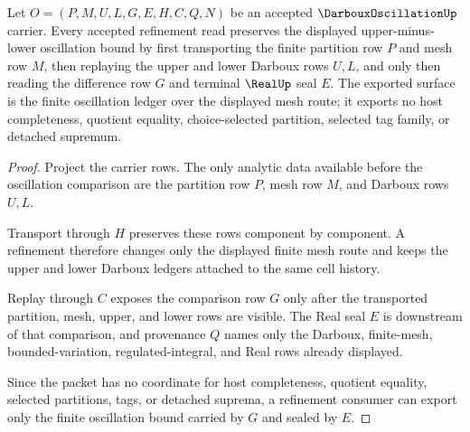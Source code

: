 \begin{theorem}\label{thm:darboux-oscillation-refinement-bound}
Let $O=(P,M,U,L,G,E,H,C,Q,N)$ be an accepted $\DarbouxOscillationUp$ carrier. Every accepted refinement read preserves the displayed upper-minus-lower oscillation bound by first transporting the finite partition row $P$ and mesh row $M$, then replaying the upper and lower Darboux rows $U,L$, and only then reading the difference row $G$ and terminal $\RealUp$ seal $E$. The exported surface is the finite oscillation ledger over the displayed mesh route; it exports no host completeness, quotient equality, choice-selected partition, selected tag family, or detached supremum.
\end{theorem}
\begin{proof}
Project the carrier rows. The only analytic data available before the oscillation comparison are the partition row $P$, mesh row $M$, and Darboux rows $U,L$.

Transport through $H$ preserves these rows component by component. A refinement therefore changes only the displayed finite mesh route and keeps the upper and lower Darboux ledgers attached to the same cell history.

Replay through $C$ exposes the comparison row $G$ only after the transported partition, mesh, upper, and lower rows are visible. The Real seal $E$ is downstream of that comparison, and provenance $Q$ names only the Darboux, finite-mesh, bounded-variation, regulated-integral, and Real rows already displayed.

Since the packet has no coordinate for host completeness, quotient equality, selected partitions, tags, or detached suprema, a refinement consumer can export only the finite oscillation bound carried by $G$ and sealed by $E$.
\end{proof}


\begin{closurestatus}{\DarbouxOscillationUp}
  \theoryclosure{\seedClosure}
  \formalstatus{\formalTargetV}
\end{closurestatus}
